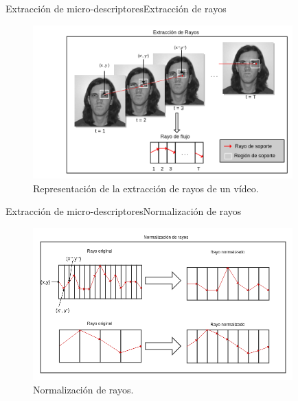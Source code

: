 \documentclass{beamer}
\begin{document}
        \begin{frame}{Extracción de micro-descriptores}{Extracción de rayos}
            \begin{figure}[bt]
        		\centering
                \includegraphics[width=10cm]{imagenes/Extraccion_de_rayos.png}
          		\caption{Representación de la extracción de rayos de un vídeo.}
            \end{figure}
        \end{frame}

        \begin{frame}{Extracción de micro-descriptores}{Normalización de rayos}
            \begin{figure}[bt]
        		\centering
                \includegraphics[width=10cm]{imagenes/normalizacion_de_rayos.png}
          		\caption{Normalización de rayos.}
            \end{figure}
        \end{frame}
    
\end{document}
